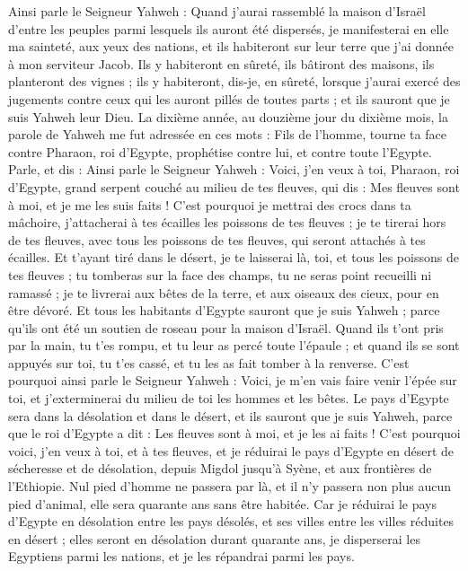 \begin{multicols}{2}
Ainsi parle le Seigneur Yahweh : Quand j'aurai rassemblé la maison d'Israël d'entre les peuples parmi lesquels ils auront été dispersés, je manifesterai en elle ma sainteté, aux yeux des nations, et ils habiteront sur leur terre que j'ai donnée à mon serviteur Jacob.
Ils y habiteront en sûreté, ils bâtiront des maisons, ils planteront des vignes ; ils y habiteront, dis-je, en sûreté, lorsque j'aurai exercé des jugements contre ceux qui les auront pillés de toutes parts ; et ils sauront que je suis Yahweh leur Dieu.
\VerseOne{}La dixième année, au douzième jour du dixième mois, la parole de Yahweh me fut adressée en ces mots :
Fils de l’homme, tourne ta face contre Pharaon, roi d'Egypte, prophétise contre lui, et contre toute l'Egypte.
Parle, et dis : Ainsi parle le Seigneur Yahweh : Voici, j'en veux à toi, Pharaon, roi d'Egypte, grand serpent couché au milieu de tes fleuves, qui dis : Mes fleuves sont à moi, et je me les suis faits !
C'est pourquoi je mettrai des crocs dans ta mâchoire, j’attacherai à tes écailles les poissons de tes fleuves ; je te tirerai hors de tes fleuves, avec tous les poissons de tes fleuves, qui seront attachés à tes écailles.
Et t'ayant tiré dans le désert, je te laisserai là, toi, et tous les poissons de tes fleuves ; tu tomberas sur la face des champs, tu ne seras point recueilli ni ramassé ; je te livrerai aux bêtes de la terre, et aux oiseaux des cieux, pour en être dévoré.
Et tous les habitants d'Egypte sauront que je suis Yahweh ; parce qu'ils ont été un soutien de roseau pour la maison d'Israël.
Quand ils t'ont pris par la main, tu t'es rompu, et tu leur as percé toute l'épaule ; et quand ils se sont appuyés sur toi, tu t'es cassé, et tu les as fait tomber à la renverse.
C'est pourquoi ainsi parle le Seigneur Yahweh : Voici, je m'en vais faire venir l'épée sur toi, et j'exterminerai du milieu de toi les hommes et les bêtes.
Le pays d'Egypte sera dans la désolation et dans le désert, et ils sauront que je suis Yahweh, parce que le roi d'Egypte a dit : Les fleuves sont à moi, et je les ai faits !
C'est pourquoi voici, j'en veux à toi, et à tes fleuves, et je réduirai le pays d'Egypte en désert de sécheresse et de désolation, depuis Migdol jusqu’à Syène, et aux frontières de l’Ethiopie.
Nul pied d'homme ne passera par là, et il n'y passera non plus aucun pied d’animal, elle sera quarante ans sans être habitée.
Car je réduirai le pays d'Egypte en désolation entre les pays désolés, et ses villes entre les villes réduites en désert ; elles seront en désolation durant quarante ans, je disperserai les Egyptiens parmi les nations, et je les répandrai parmi les pays.

\end{multicols}
